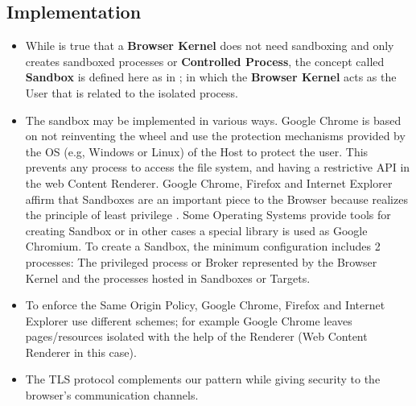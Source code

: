 \documentclass{sig-alternate-05-2015}
\begin{document}
  \subsection*{Implementation}
  \begin{itemize}
    \item While is true that a \textbf{Browser Kernel} does not need sandboxing and only creates sandboxed processes or \textbf{Controlled Process}, the concept called \textbf{Sandbox} is defined here as in \cite{fernandez2013security}; in which the \textbf{Browser Kernel} acts as the User that is related to the isolated process.
    \item The sandbox may be implemented in various ways. Google Chrome \cite{sandboxGC} is based on not reinventing the wheel and use the protection mechanisms provided by the OS (e.g, Windows or Linux) of the Host to protect the user. This prevents any process to access the file system, and having a restrictive API in the web Content Renderer. Google Chrome, Firefox and Internet Explorer affirm that Sandboxes are an important piece to the Browser because realizes the principle of least privilege \cite{Yason,sandboxGC,sandboxFirefox}. Some Operating Systems provide tools for creating Sandbox or in other cases a special library is used as Google Chromium. To create a Sandbox, the minimum configuration includes 2 processes: The privileged process or Broker represented by the Browser Kernel and the processes hosted in Sandboxes or Targets.
    \item To enforce the Same Origin Policy, Google Chrome, Firefox and Internet Explorer use different schemes; for example Google Chrome leaves pages/resources isolated with the help of the Renderer (Web Content Renderer in this case).
    \item The TLS protocol complements our pattern while giving security to the browser's communication channels.
  \end{itemize}
\end{document}
